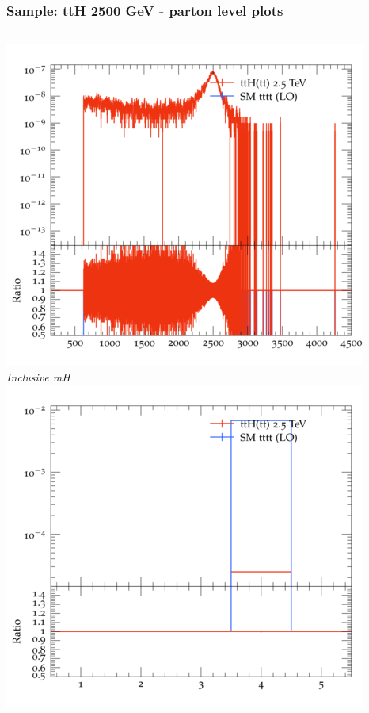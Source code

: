 \documentclass{beamer}
\begin{document}
\begin{frame}
\frametitle{Sample: ttH 2500 GeV - parton level plots}
\begin{columns}
\includegraphics[width=\textwidth]{../plots/ttH_2500/tttt_ttH/Inclusive_mH.png}\\
\textit{\small Inclusive mH}
\includegraphics[width=\textwidth]{../plots/ttH_2500/tttt_ttH/Inclusive_nTop.png}\\

\end{columns}
\end{frame}
\end{document}

